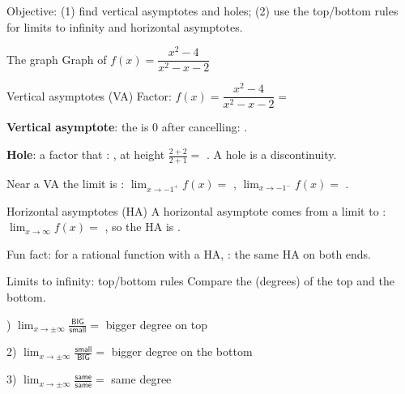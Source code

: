 \begin{center}\textsf{\small\color{apgrey}Objective: (1) find vertical asymptotes and holes; (2) use the top/bottom rules for limits to infinity and horizontal asymptotes.}\end{center}
\begin{nrow}{The graph}
\centering Graph of $f(x)=\dfrac{x^2-4}{x^2-x-2}$
\end{nrow}
\begin{nrow}{Vertical asymptotes (VA)}
Factor: $f(x)=\dfrac{x^2-4}{x^2-x-2}=$ \par\smallskip
\textbf{Vertical asymptote}: the  is $0$ after cancelling: .\par
\textbf{Hole}: a factor that : , at height $\frac{2+2}{2+1}=$ . A hole is a  discontinuity.\par
Near a VA the limit is \fillin{$\pm\infty$}: \;$\displaystyle\lim_{x\to-1^+}f(x)=$ \fillin{$+\infty$}, \;$\displaystyle\lim_{x\to-1^-}f(x)=$ \fillin{$-\infty$}.
\end{nrow}
\begin{nrow}{Horizontal asymptotes (HA)}
A horizontal asymptote comes from a limit to : $\displaystyle\lim_{x\to\infty}f(x)=$ , so the HA is .\par\smallskip
Fun fact: for a rational function with a HA, : the same HA on both ends.
\end{nrow}
\begin{nrow}{Limits to infinity: top/bottom rules}
Compare the  (degrees) of the top and the bottom.\par{}) $\displaystyle\lim_{x\to\pm\infty}\frac{\textsf{BIG}}{\textsf{small}}=$  \quad bigger degree on top\par
2) $\displaystyle\lim_{x\to\pm\infty}\frac{\textsf{small}}{\textsf{BIG}}=$  \quad bigger degree on the bottom\par
3) $\displaystyle\lim_{x\to\pm\infty}\frac{\textsf{same}}{\textsf{same}}=$  \quad same degree
\end{nrow}
